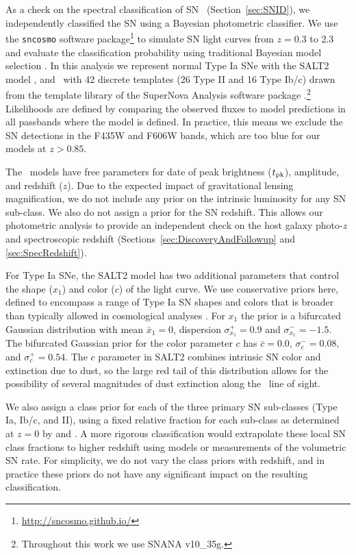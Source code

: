 As a check on the spectral classification of SN \tomas\
(Section~\ref{sec:SNID}), we independently classified the SN using a
Bayesian photometric classifier.  We use the {\tt sncosmo} software
package\footnote{\url{http://sncosmo.github.io/}} to simulate SN light
curves from $z=0.3$ to 2.3 and evaluate the classification probability
using traditional Bayesian model selection \citep[as
in][]{Jones:2013,Rodney:2014,Graur:2014,Rodney:2015a}.  In this
analysis we represent normal Type Ia SNe with the SALT2
model \citep{Guy:2010}, and \CCSNe\ with 42 discrete templates (26
Type II and 16 Type Ib/c) drawn from the template library of the
SuperNova Analysis software
package \citep[SNANA,][]{Kessler:2009a}.\footnote{Throughout this work
we use SNANA v10\_35g.}  Likelihoods are defined by comparing the
observed fluxes to model predictions in all passbands where the model
is defined.  In practice, this means we exclude the SN detections in
the F435W and F606W bands, which are too blue for our models at
$z>0.85$.

The \CCSN\ models have free parameters for date of peak brightness
($t_{\rm pk}$), amplitude, and redshift ($z$). Due to the expected
impact of gravitational lensing magnification, we do not include any
prior on the intrinsic luminosity for any SN sub-class.  We also do
not assign a prior for the SN redshift. This allows our photometric
analysis to provide an independent check on the host galaxy photo-$z$
and spectroscopic redshift (Sections~\ref{sec:DiscoveryAndFollowup}
and \ref{sec:SpecRedshift}).

For Type Ia SNe, the SALT2 model has two additional parameters that
control the shape ($x_1$) and color ($c$) of the light curve.  We use
conservative priors here, defined to encompass a range of Type Ia SN
shapes and colors that is broader than typically allowed in
cosmological analyses \citep[see
e.g.,][]{Kessler:2009b,Sullivan:2011,Rest:2014}. For $x_1$ the prior
is a bifurcated Gaussian distribution with mean $\bar{x}_1=0$,
dispersion $\sigma_{x_1}^+={0.9}$ and $\sigma_{x_1}^-={-1.5}$.  The
bifurcated Gaussian prior for the color parameter $c$ has
$\bar{c}=0.0$, $\sigma_c^-=0.08$, and $\sigma_c^+=0.54$.  The $c$
parameter in SALT2 combines intrinsic SN color and extinction due to
dust, so the large red tail of this distribution allows for the
possibility of several magnitudes of dust extinction along the \tomas\
line of sight.

We also assign a class prior for each of the three primary SN
sub-classes (Type Ia, Ib/c, and II), using a fixed relative fraction for
each sub-class as determined at $z=0$ by \citet{Smartt:2009}
and \citet{Li:2011a}.  A more rigorous classification would extrapolate
these local SN class fractions to higher redshift using models or
measurements of the volumetric SN rate.  For simplicity, we do not
vary the class priors with redshift, and in practice these priors do
not have any significant impact on the resulting classification.

